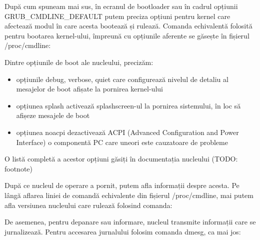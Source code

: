 După cum spuneam mai sus, în ecranul de bootloader sau în cadrul opțiunii
GRUB_CMDLINE_DEFAULT putem preciza opțiuni pentru kernel care afectează modul în
care acesta bootează și rulează. Comanda echivalentă folosită pentru bootarea
kernel-ului, împreună cu opțiunile aferente se găsește în fișierul
/proc/cmdline:


Dintre opțiunile de boot ale nucleului, precizăm:

\begin{itemize}
	\item opțiunile debug, verbose, quiet care configurează nivelul de
		detaliu al mesajelor de boot afișate la pornirea kernel-ului
	\item opțiunea splash activează splashscreen-ul la pornirea sistemului,
		în loc să afișeze mesajele de boot
	\item opțiunea noacpi dezactivează ACPI (Advanced Configuration and
		Power Interface) o componentă PC care uneori este cauzatoare de
		probleme
\end{itemize}

O listă completă a acestor opțiuni găsiți în documentația nucleului (TODO:
footnote)

După ce nucleul de operare a pornit, putem afla informații despre acesta. Pe
lângă aflarea liniei de comandă echivalente din fișierul /proc/cmdline, mai
putem afla versiunea nucleului care rulează folosind comanda:


De asemenea, pentru depanare sau informare, nucleul transmite informații care se
jurnalizează. Pentru accesarea jurnalului folosim comanda dmesg, ca mai jos:


